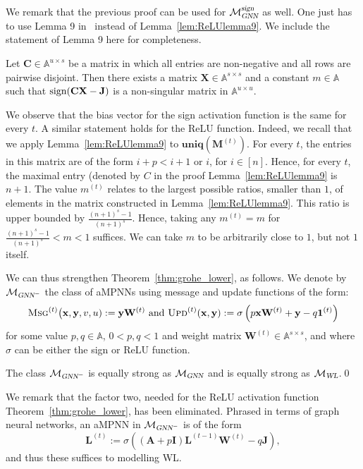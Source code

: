 We remark that the previous proof can be used for $\mathcal{M}_{\textsl{GNN}}^{\textsl{sign}}$ as well. One just has to use Lemma 9 in~\cite{grohewl} instead of
Lemma~\ref{lem:ReLUlemma9}. We include the statement of Lemma 9
here for completeness.
\begin{lemma}\label{lem:signlemma9}
  Let  $\mathbf{C}\in \mathbb{A}^{u\times s}$ be a matrix in which 
  all entries are non-negative and  all rows are pairwise disjoint.
  Then there exists a matrix $\mathbf{X}\in\mathbb{A}^{s\times s}$ and a constant $m\in\mathbb{A}$
  such that $\text{\normalfont sign}(\mathbf{CX}-\mathbf{J})$ is a
  non-singular matrix in $\mathbb{A}^{u\times u}$.
\end{lemma}

We observe that the bias vector for the sign activation function is the same for every $t$. A similar statement holds for the ReLU function.
Indeed, we recall that we apply Lemma~\ref{lem:ReLUlemma9} to
$\mathbf{uniq}(\mathbf{M}^{(t)})$. For every $t$,
the entries in this matrix are of the form $i+p<i+1$
or $i$, for $i\in[n]$. Hence, for every $t$, the maximal entry (denoted by $C$ in the proof Lemma~\ref{lem:ReLUlemma9}  is $n+1$. The value $m^{(t)}$ relates to the largest possible ratios, smaller than $1$, of elements in the matrix constructed in  Lemma~\ref{lem:ReLUlemma9}. This ratio is upper bounded by $\frac{(n+1)^s-1}{(n+1)^s}$. Hence, taking
any $m^{(t)}=m$ for $\frac{(n+1)^s-1}{(n+1)^s}<m<1$
suffices. We can take $m$ to be arbitrarily close to $1$, but not $1$ itself.

We can thus strengthen Theorem~\ref{thm:grohe_lower}, as follows. We denote by $\mathcal{M}_{\textsl{GNN}^-}$ the 
class of aMPNNs using message and update functions of the form:
\begin{equation}\textsc{Msg}^{(t)}\bigl(\mathbf{x},\mathbf{y},v,u):=\mathbf{y}\mathbf{W}^{(t)}
\text{ and } 
\textsc{Upd}^{(t)}(\mathbf{x},\mathbf{y}):=\sigma\left(p\mathbf{x}\mathbf{W}^{(t)}+\mathbf{y} -q \mathbf{1}^{(t)}\right) \label{eq:MPNN-GNN-simple}
\end{equation}
for some value $p,q\in\mathbb{A}$, $0<p,q<1$ and weight matrix $\mathbf{W}^{(t)}\in\mathbb{A}^{s\times s}$, and where
$\sigma$ can be either the sign or ReLU function.
\begin{corollary}
The class $\mathcal{M}_{\textsl{GNN}^-}$ is equally strong as $\mathcal{M}_{\textsl{GNN}}$ and is equally strong as $\mathcal{M}_{\textsl{WL}}$.\qed
\end{corollary}
We remark that the factor two, needed for the ReLU activation function Theorem~\ref{thm:grohe_lower}, has been eliminated. Phrased in terms of graph neural networks, an aMPNN in $\mathcal{M}_{\textsl{GNN}^-}$ is of the form
$$
\mathbf{L}^{(t)}:=\sigma\left((\mathbf{A}+p\mathbf{I})\mathbf{L}^{(t-1)}\mathbf{W}^{(t)}-q\mathbf{J}\right),
$$
and thus these suffices to modelling WL.

